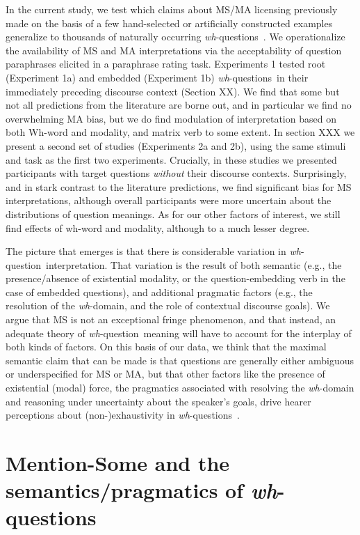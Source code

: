 \documentclass[12pt,letterpaper,table,svgnames,dvipsnames]{article}
\newcommand{\jd}[1]{\textcolor{Purple}{[jd: #1]}}
\newcommand{\whq}{\emph{wh}-question~}
\newcommand{\whqs}{\emph{wh}-questions~}
\begin{document}
In the current study, we test which claims about MS/MA licensing previously made on the basis of a few hand-selected or artificially constructed examples generalize to thousands of naturally occurring \whqs$\!$. We operationalize the availability of MS and MA interpretations via the acceptability of question paraphrases elicited in a paraphrase rating task. Experiments 1 tested root (Experiment 1a) and embedded (Experiment 1b) \whqs in their immediately preceding discourse context (Section XX). We find that some but not all predictions from the literature are borne out, and in particular we find no overwhelming MA bias, but we do find modulation of interpretation based on both Wh-word and modality, and matrix verb to some extent. In section XXX we present a second set of studies (Experiments 2a and 2b), using the same stimuli and task as the first two experiments. Crucially, in these studies we presented participants with target questions \emph{without} their discourse contexts. Surprisingly, and in stark contrast to the literature predictions, we find significant bias for MS interpretations, although overall participants were more uncertain about the distributions of question meanings. As for our other factors of interest, we still find effects of wh-word and modality, although to a much lesser degree.

The picture that emerges is that there is considerable variation in \whq interpretation. That variation is the result of both semantic (e.g., the presence/absence of existential modality, or the question-embedding verb in the case of embedded questions), and additional pragmatic factors (e.g., the resolution of the \emph{wh}-domain, and the role of contextual discourse goals). We argue that MS is not an exceptional fringe phenomenon, and that instead, an adequate theory of \whq meaning will have to account for the interplay of both kinds of factors. On this basis of our data, we think that the maximal semantic claim that can be made is that questions are generally either ambiguous or underspecified for MS or MA, but that other factors like the presence of existential (modal) force, the pragmatics associated with resolving the \emph{wh}-domain and reasoning under uncertainty about the speaker's goals, drive hearer perceptions about (non-)exhaustivity in \whqs $\!$. 



\section{Mention-Some and the semantics/pragmatics of \whqs}
\end{document}
